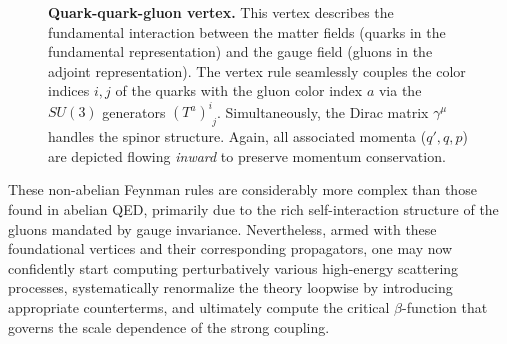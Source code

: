 \begin{figure}[H]
    \centering
    \begin{minipage}{0.5\textwidth}
        \caption{\textbf{Quark-quark-gluon vertex.} This vertex describes the fundamental interaction between the matter fields (quarks in the fundamental representation) and the gauge field (gluons in the adjoint representation). The vertex rule seamlessly couples the color indices \(i, j\) of the quarks with the gluon color index \(a\) via the \(SU(3)\) generators \((T^a)^i_{\phantom{i}j}\). Simultaneously, the Dirac matrix \(\gamma^\mu\) handles the spinor structure. Again, all associated momenta (\(q', q, p\)) are depicted flowing \textit{inward} to preserve momentum conservation.}
        \label{fig:quark_gluon_vertex_detail}
    \end{minipage}
    \hfill
    \begin{minipage}{0.45\textwidth}
        \centering
    \end{minipage}
\end{figure}

These non-abelian Feynman rules are considerably more complex than those found in abelian QED, primarily due to the rich self-interaction structure of the gluons mandated by gauge invariance. Nevertheless, armed with these foundational vertices and their corresponding propagators, one may now confidently start computing perturbatively various high-energy scattering processes, systematically renormalize the theory loopwise by introducing appropriate counterterms, and ultimately compute the critical \(\beta\)-function that governs the scale dependence of the strong coupling.

